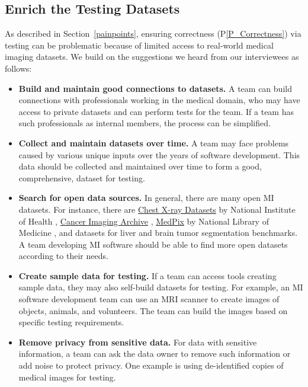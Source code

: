 \documentclass[final, 12pt, 3p, times]{elsarticle}
\newcommand{\ppref}[1]{P\ref{#1}}
\begin{document}
\subsection{Enrich the Testing Datasets} 
\label{sec_recommendations_testing_dataset}

As described in Section~\ref{painpoints}, ensuring correctness
(\ppref{P_Correctness}) via testing can be problematic because of limited access
to real-world medical imaging datasets.  We build on the suggestions we heard
from our interviewees as follows:

\begin{itemize}
\item \textbf{Build and maintain good connections to datasets.} A team can build
connections with professionals working in the medical domain, who may have
access to private datasets and can perform tests for the team. If a team has
such professionals as internal members, the process can be simplified.

\item \textbf{Collect and maintain datasets over time.} A team may face problems
caused by various unique inputs over the years of software development. This
data should be collected and maintained over time to form a good, comprehensive,
dataset for testing.

\item \textbf{Search for open data sources.} In general, there are many open MI
datasets.  For instance, there are
\href{https://nihcc.app.box.com/v/ChestXray-NIHCC}{Chest X-ray Datasets} by
National Institute of Health \cite{WangEtAl2017},
\href{https://www.cancerimagingarchive.net/}{Cancer Imaging Archive}
\cite{PriorEtAl2017}, \href{https://medpix.nlm.nih.gov/home}{MedPix} by
National Library of Medicine \cite{Smirniotopoulos2014}, and datasets for liver
\cite{BilicEtAl2019} and brain \cite{MenzeEtAl2015} tumor segmentation
benchmarks.  A team developing MI software should be able to find more open
datasets according to their needs.

\item \textbf{Create sample data for testing.} If a team can access tools
creating sample data, they may also self-build datasets for testing. For
example, an MI software development team can use an MRI scanner to create images
of objects, animals, and volunteers. The team can build the images based on
specific testing requirements.

\item \textbf{Remove privacy from sensitive data.} For data with sensitive
information, a team can ask the data owner to remove such information or add
noise to protect privacy. One example is using de-identified copies of medical
images for testing.


\end{itemize}
\end{document}
